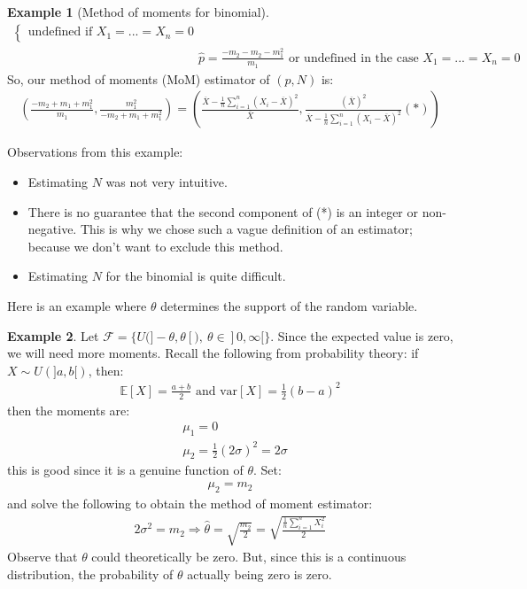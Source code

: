 \documentclass[11pt]{scrartcl}
\theoremstyle{definition}
\newtheorem{ex}{Example}
\theoremstyle{remark}
\newcommand{\dist}[0]{\mathcal{F}}
\newcommand{\EX}[1]{\mathbb{E}\left[#1 \right]}
\begin{document}
\begin{ex}[Method of moments for binomial]
\begin{align*}
\begin{cases}
				\text{undefined if } X_1 = ... = X_n = 0 
		\end{cases}	 \\
		& \hat{p} = \frac{-m_2 - m_2 - m_1^2}{m_1} \text{ or undefined in the case } X_1 = ... = X_n = 0 
	\end{align*}
	So, our method of moments (MoM) estimator of $(p, N)$ is: 
	\begin{align*}
		\left( \frac{-m_2 + m_1 + m_1^2}{m_1} , \frac{m_1^2}{-m_2 + m_1 + m_1^2}  \right) = \left( \frac{\overline{X} - \frac{1}{n} \sum_{i=1}^n (X_i - \overline{X})^2}{\overline{X}} , \frac{(\overline{X})^2}{\overline{X} - \frac{1}{n} \sum_{i=1}^n (X_i - \overline{X})^2}  (*) \right) 	
	\end{align*}
\end{ex}
	Observations from this example: 
	\begin{itemize}[noitemsep]
		\item Estimating $N$ was not very intuitive. 
		\item There is no guarantee that the second component of (*) is an integer or non-negative. This is why we chose such a vague definition of an estimator; because we don't want to exclude this method. 
		\item Estimating $N$ for the binomial is quite difficult. 
	\end{itemize}
	
	Here is an example where $\theta$ determines the support of the random variable. 
	
\begin{ex} 
	Let $\dist = \{ U (]-\theta, \theta[),\ \theta \in ]0, \infty[ \}$. 	Since the expected value is zero, we will need more moments. Recall the following from probability theory: if $X \sim U(]a,b[)$, then: 
	\begin{align*}
		\EX{X} = \frac{a+b}{2} 	\text{ and } \text{var}[X] = \frac{1}{2} (b-a)^2
	\end{align*}
	then the moments are: 
	\begin{align*}
		& \mu_1 = 0 \\
		& \mu_2 = \frac{1}{2} (2 \sigma)^2 = 2 \sigma 	
	\end{align*}
	this is good since it is a genuine function of $\theta$. Set: 
	\begin{align*}
		\mu_2 = m_2	
	\end{align*}
	and solve the following to obtain the method of moment estimator: 
	\begin{align*}
		2 \sigma^2 = m_2 \Rightarrow \hat{\theta} = \sqrt{\frac{m_2}{2}} = \sqrt{\frac{\frac{1}{n} \sum_{i=1}^n X_i^2}{2}}	
	\end{align*}
	Observe that $\theta$ could theoretically be zero. But, since this is a continuous distribution, the probability of $\theta$ actually being zero is zero. 
\end{ex}
\end{document}

